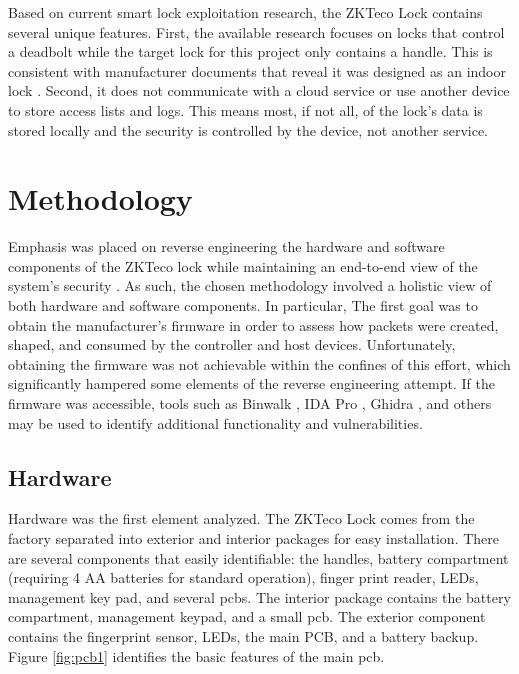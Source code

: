 \documentclass[conference]{IEEEtran}
\begin{document}
\bigskip

Based on current smart lock exploitation research, the ZKTeco Lock contains several unique features. First, the available research focuses on locks that control a deadbolt while the target lock for this project only contains a handle. This is consistent with manufacturer documents that reveal it was designed as an indoor lock \cite{ZKTeco}. Second, it does not communicate with a cloud service or use another device to store access lists and logs. This means most, if not all, of the lock's data is stored locally and the security is controlled by the device, not another service.

\section{Methodology}

Emphasis was placed on reverse engineering the hardware and software components of the ZKTeco lock while maintaining an end-to-end view of the system's security \cite{Ling2018}.  As such, the chosen methodology involved a holistic view of both hardware and software components.  In particular, The first goal was to obtain the manufacturer's firmware in order to assess how packets were created, shaped, and consumed by the controller and host devices.  Unfortunately, obtaining the firmware was not achievable within the confines of this effort, which significantly hampered some elements of the reverse engineering attempt. If the firmware was accessible, tools such as Binwalk \cite{Heffner2019}, IDA Pro \cite{Hex-Rays2019}, Ghidra \cite{NationalSecurityAgency2019}, and others may be used to identify additional functionality and vulnerabilities. 

\subsection{Hardware}

Hardware was the first element analyzed. The ZKTeco Lock comes from the factory separated into exterior and interior packages for easy installation. There are several components that easily identifiable: the handles, battery compartment (requiring 4 AA batteries for standard operation), finger print reader, LEDs, management key pad, and several \gls{pcb}s. The interior package contains the battery compartment, management keypad, and a small \gls{pcb}.  The exterior component contains the fingerprint sensor, LEDs, the main PCB, and a battery backup.  Figure \ref{fig:pcb1} identifies the basic features of the main \gls{pcb}.
\end{document}
